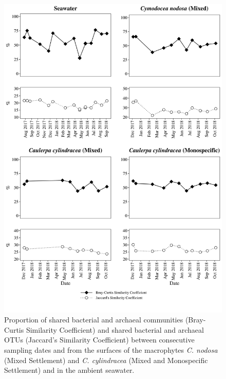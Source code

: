 \documentclass[12pt,]{article}
\begin{document}
\begin{figure}[H]

{\centering \includegraphics[width=0.85\linewidth]{../results/figures/seasonal_shared} 

}

\caption{Proportion of shared bacterial and archaeal communities (Bray-Curtis Similarity Coefficient) and shared bacterial and archaeal OTUs (Jaccard's Similarity Coefficient) between consecutive sampling dates and from the surfaces of the macrophytes \textit{C. nodosa} (Mixed Settlement) and \textit{C. cylindracea} (Mixed and Monospecific Settlement) and in the ambient seawater.\label{shared}}\label{fig:unnamed-chunk-2}
\end{figure}
\end{document}
